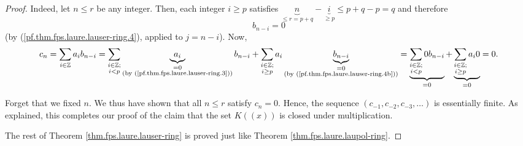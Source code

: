 \begin{fineprint}
\begin{proof}
Indeed, let $n\leq r$ be any integer. Then, each integer $i\geq p$ satisfies
$\underbrace{n}_{\leq r=p+q}-\underbrace{i}_{\geq p}\leq p+q-p=q$ and
therefore
\begin{equation}
b_{n-i}=0 \label{pf.thm.fps.laure.lauser-ring.4b}%
\end{equation}
(by (\ref{pf.thm.fps.laure.lauser-ring.4}), applied to $j=n-i$). Now,%
\[
c_{n}=\sum_{i\in\mathbb{Z}}a_{i}b_{n-i}=\sum_{\substack{i\in\mathbb{Z}%
;\\i<p}}\underbrace{a_{i}}_{\substack{=0\\\text{(by
(\ref{pf.thm.fps.laure.lauser-ring.3}))}}}b_{n-i}+\sum_{\substack{i\in
\mathbb{Z};\\i\geq p}}a_{i}\underbrace{b_{n-i}}_{\substack{=0\\\text{(by
(\ref{pf.thm.fps.laure.lauser-ring.4b}))}}}=\underbrace{\sum_{\substack{i\in
\mathbb{Z};\\i<p}}0b_{n-i}}_{=0}+\underbrace{\sum_{\substack{i\in
\mathbb{Z};\\i\geq p}}a_{i}0}_{=0}=0.
\]


Forget that we fixed $n$. We thus have shown that all $n\leq r$ satisfy
$c_{n}=0$. Hence, the sequence $\left(  c_{-1},c_{-2},c_{-3},\ldots\right)  $
is essentially finite. As explained, this completes our proof of the claim
that the set $K\left(  \left(  x\right)  \right)  $ is closed under multiplication.

The rest of Theorem \ref{thm.fps.laure.lauser-ring} is proved just like
Theorem \ref{thm.fps.laure.laupol-ring}.
\end{proof}
\end{fineprint}
